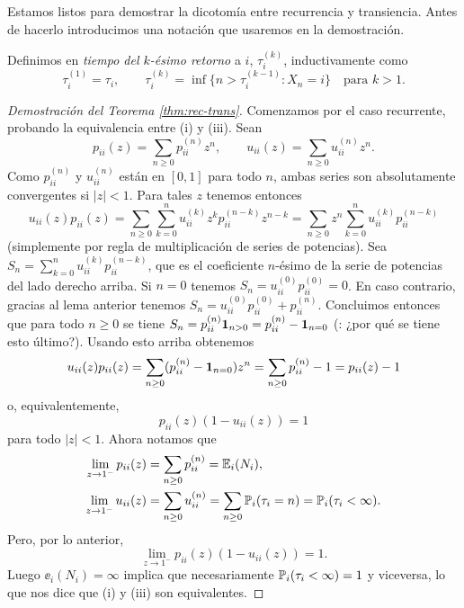 Estamos listos para demostrar la dicotomía entre recurrencia y transiencia.
Antes de hacerlo introducimos una notación que usaremos en la demostración.

\begin{defn}
Definimos en \emph{tiempo del $k$-ésimo retorno} a $i$, $\tau^{(k)}_i$, inductivamente como
\[\tau^{(1)}_i=\tau_i,\qquad\tau^{(k)}_i=\inf\{n>\tau^{(k-1)}_i\!:X_n=i\}\quad\text{para $k>1$}.\]
\end{defn}

\begin{proof}[Demostración del Teorema \ref{thm:rec-trans}]
Comenzamos por el caso recurrente, probando la equivalencia entre (i) y (iii).
Sean
\begin{equation}
p_{ii}(z)=\sum_{n\geq0}p^{(n)}_{ii}z^n,\qquad u_{ii}(z)=\sum_{n\geq0}u^{(n)}_{ii}z^n.
\end{equation}
Como $p^{(n)}_{ii}$ y $u^{(n)}_{ii}$ están en $[0,1]$ para todo $n$, ambas series son absolutamente convergentes si $|z|<1$.
Para tales $z$ tenemos entonces
\[u_{ii}(z)p_{ii}(z)=\sum_{n\geq0}\sum_{k=0}^nu_{ii}^{(k)}z^kp_{ii}^{(n-k)}z^{n-k}=\sum_{n\geq0}z^n\sum_{k=0}^nu_{ii}^{(k)}p_{ii}^{(n-k)}\]
(simplemente por regla de multiplicación de series de potencias).
Sea $S_n=\sum_{k=0}^nu_{ii}^{(k)}p_{ii}^{(n-k)}$, que es el coeficiente $n$-ésimo de la serie de potencias del lado derecho arriba.
Si $n=0$ tenemos $S_n=u_{ii}^{(0)}p_{ii}^{(0)}=0$.
En caso contrario, gracias al lema anterior tenemos $S_n=u_{ii}^{(0)}p_{ii}^{(0)}+p_{ii}^{(n)}$.
Concluimos entonces que para todo $n\geq0$ se tiene $S_n=p_{ii}^{(n)}\mathbf{1}_{n>0}=p_{ii}^{(n)}-\mathbf{1}_{n=0}$ (\uexers: ¿por qué se tiene esto último?).
Usando esto arriba obtenemos
\[u_{ii}(z)p_{ii}(z)=\sum_{n\geq0}(p_{ii}^{(n)}-\mathbf{1}_{n=0})z^n=\sum_{n\geq0}p_{ii}^{(n)}-1=p_{ii}(z)-1\]
o, equivalentemente,
\[p_{ii}(z)(1-u_{ii}(z))=1\]
para todo $|z|<1$.
Ahora notamos que
\begin{align}
\lim_{z\to1^-}p_{ii}(z)&=\sum_{n\geq0}p_{ii}^{(n)}=\mathbb{E}_i(N_i),\\
\lim_{z\to1^-}u_{ii}(z)&=\sum_{n\geq0}u_{ii}^{(n)}=\sum_{n\geq0}\mathbb{P}_i(\tau_i=n)=\mathbb{P}_i(\tau_i<\infty).
\end{align}
Pero, por lo anterior,
\[\lim_{z\to1^-}p_{ii}(z)(1-u_{ii}(z))=1.\]
Luego $\ee_i(N_i)=\infty$ implica que necesariamente $\mathbb{P}_i(\tau_i<\infty)=1$ y viceversa, lo que nos dice que (i) y (iii) son equivalentes.


\end{proof}
